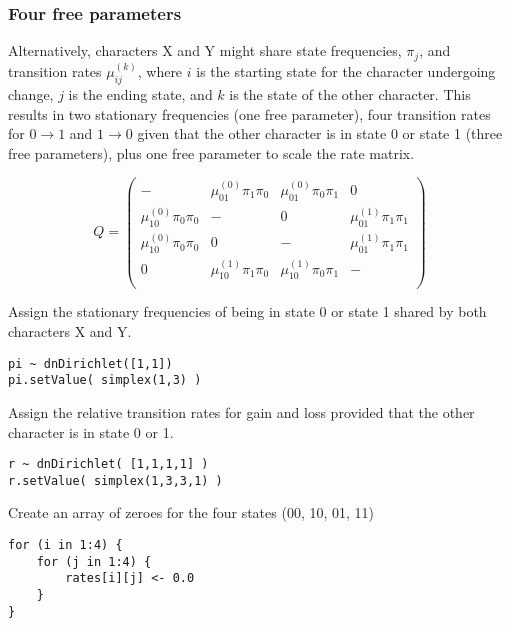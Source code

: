 \subsubsection{Four free parameters}

Alternatively, characters X and Y might share state frequencies, $\pi_j$, and transition rates $\mu_{ij}^{(k)}$, where $i$ is the starting state for the character undergoing change, $j$ is the ending state, and $k$ is the state of the other character.
This results in two stationary frequencies (one free parameter), four transition rates for $0 \rightarrow 1$ and $1 \rightarrow 0$ given that the other character is in state 0 or state 1 (three free parameters), plus one free parameter to scale the rate matrix.

\begin{equation*}
Q = \begin{pmatrix}
- & \mu_{01}^{(0)} \pi_1 \pi_0 & \mu_{01}^{(0)} \pi_0 \pi_1 & 0 \\
\mu_{10}^{(0)} \pi_0 \pi_0 & -   & 0 & \mu_{01}^{(1)} \pi_1 \pi_1 \\
\mu_{10}^{(0)} \pi_0 \pi_0 & 0   & - & \mu_{01}^{(1)} \pi_1 \pi_1 \\
0 & \mu_{10}^{(1)} \pi_1 \pi_0 & \mu_{10}^{(1)} \pi_0 \pi_1 & - \\
\end{pmatrix}
\end{equation*}

Assign the stationary frequencies of being in state 0 or state 1 shared by both characters X and Y.

{\tt \begin{snugshade*}
\begin{lstlisting}
pi ~ dnDirichlet([1,1])
pi.setValue( simplex(1,3) )
\end{lstlisting}
\end{snugshade*}}

Assign the relative transition rates for gain and loss provided that the other character is in state 0 or 1.

{\tt \begin{snugshade*}
\begin{lstlisting}
r ~ dnDirichlet( [1,1,1,1] )
r.setValue( simplex(1,3,3,1) )
\end{lstlisting}
\end{snugshade*}}

Create an array of zeroes for the four states (00, 10, 01, 11)

{\tt \begin{snugshade*}
\begin{lstlisting}
for (i in 1:4) {
    for (j in 1:4) {
        rates[i][j] <- 0.0
    }
}
\end{lstlisting}
\end{snugshade*}}

